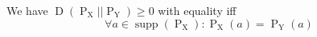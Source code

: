 We have 
$\operatorname{D}(\operatorname{P}_{\operatorname{X}} || \operatorname{P}_{\operatorname{Y}}) \geq 0$
with equality iff
$$\forall a \in \operatorname{supp}(\operatorname{P}_{\operatorname{X}}) : \operatorname{P}_{\operatorname{X}}(a) = \operatorname{P}_{\operatorname{Y}}(a)$$
